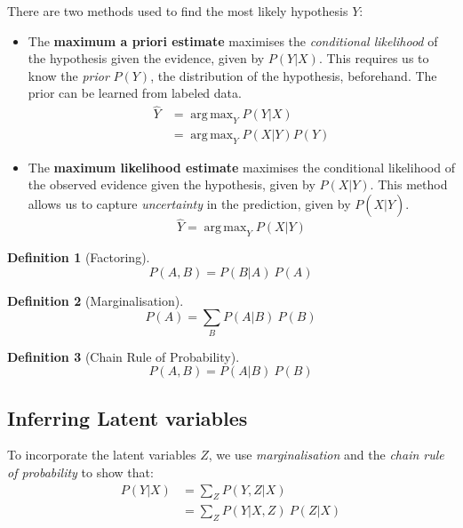 \documentclass[12pt,a4paper,twoside,openright]{report}
\DeclareMathOperator*{\argmax}{arg\,max}
\theoremstyle{definition}
\newtheorem{definition}{Definition}[section]
\begin{document}
There are two methods used to find the most likely hypothesis $Y$:
\begin{itemize}
  \item  The \textbf{maximum a priori estimate} maximises the \textit{conditional likelihood} of the hypothesis given the evidence, given by $P(Y|X)$. This requires us to know the \textit{prior} $P(Y)$, the distribution of the hypothesis, beforehand. The prior can be learned from labeled data.
    \begin{equation}
      \begin{align}
        \hat{Y} &= \argmax_Y P(Y|X) \\
                &= \argmax_Y P(X|Y)P(Y)
      \end{align}
      \label{eq:map}
    \end{equation}
  \item  The \textbf{maximum likelihood estimate} maximises the conditional likelihood of the observed evidence given the hypothesis, given by $P(X|Y)$. This method allows us to capture \textit{uncertainty} in the prediction, given by $P(X|\hat{Y})$. 
    \begin{equation}
      \hat{Y} = \argmax_Y P(X|Y)
      \label{eq:mle}
    \end{equation}
\end{itemize}

\begin{definition}[Factoring]
\begin{equation}
  P(A,B) = P(B|A)~P(A)
  \label{eq:bayesRule}
\end{equation}
\end{definition}

\begin{definition}[Marginalisation]
\begin{equation}
  P(A) = \sum\limits_B P(A|B)~P(B)
  \label{eq:marginalisation}
\end{equation}
\end{definition}

\begin{definition}[Chain Rule of Probability]
\begin{equation}
  P(A,B) = P(A|B)~P(B)
  \label{eq:chainRule}
\end{equation}
\end{definition}

\subsection{Inferring Latent variables}
To incorporate the latent variables $Z$, we use \textit{marginalisation} and the \textit{chain rule of probability} to show that: 
\begin{equation}
  \begin{align*}
    P(Y|X) &= \sum\limits_Z P(Y,Z|X) \\
           &= \sum\limits_Z P(Y|X,Z)~P(Z|X) 
  \end{align*}
  \label{eq:}
\end{equation}
\end{document}
